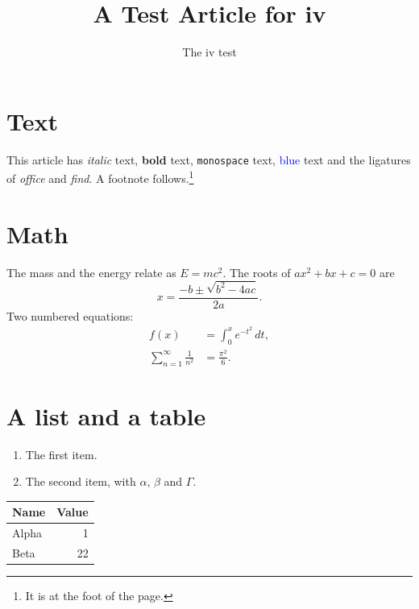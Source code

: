 \documentclass{article}
\title{A Test Article for iv}
\author{The iv test}
\date{}
\begin{document}
\maketitle

\section{Text}

This article has \emph{italic} text, \textbf{bold} text,
\texttt{monospace} text, \textcolor{blue}{blue} text and the ligatures of
\emph{office} and \emph{find}. A footnote follows.\footnote{It is at the
foot of the page.}

\section{Math}

The mass and the energy relate as $E = mc^2$. The roots of
$ax^2 + bx + c = 0$ are
\[
  x = \frac{-b \pm \sqrt{b^2 - 4ac}}{2a}.
\]
Two numbered equations:
\begin{align}
  f(x) &= \int_0^x e^{-t^2}\,dt, \\
  \sum_{n=1}^{\infty} \frac{1}{n^2} &= \frac{\pi^2}{6}.
\end{align}

\section{A list and a table}

\begin{enumerate}
  \item The first item.
  \item The second item, with $\alpha$, $\beta$ and $\Gamma$.
\end{enumerate}

\begin{tabular}{|l|r|}
  \hline
  Name & Value \\
  \hline
  Alpha & 1 \\
  Beta & 22 \\
  \hline
\end{tabular}
\end{document}
